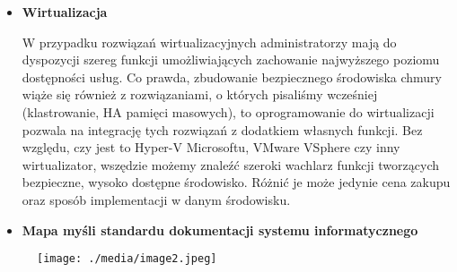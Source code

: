 \documentclass[12pt]{article}
\renewcommand{\_}{\kern-1.5pt\textunderscore\kern-1.5pt}
\begin{document}
\begin{itemize}
\vspace{\baselineskip}
	\item \textbf{Wirtualizacja}\par

W przypadku rozwiązań wirtualizacyjnych administratorzy mają do dyspozycji szereg funkcji umożliwiających zachowanie najwyższego poziomu dostępności usług. Co prawda, zbudowanie bezpiecznego środowiska chmury wiąże się również z rozwiązaniami, o których pisaliśmy wcześniej (klastrowanie, HA pamięci masowych), to oprogramowanie do wirtualizacji pozwala na integrację tych rozwiązań z dodatkiem własnych funkcji. Bez względu, czy jest to Hyper-V Microsoftu, VMware VSphere czy inny wirtualizator, wszędzie możemy znaleźć szeroki wachlarz funkcji tworzących bezpieczne, wysoko dostępne środowisko. Różnić je może jedynie cena zakupu oraz sposób implementacji w danym środowisku.\par


\vspace{\baselineskip}

\vspace{\baselineskip}

\vspace{\baselineskip}
	\item \textbf{Mapa myśli standardu dokumentacji systemu informatycznego }
\end{itemize}\par




\begin{figure}[H]
	\begin{Center}
		\texttt{[image: ./media/image2.jpeg]}
	\end{Center}
\end{figure}




\vspace{\baselineskip}

\vspace{\baselineskip}

\vspace{\baselineskip}

\vspace{\baselineskip}

\vspace{\baselineskip}

\vspace{\baselineskip}

\vspace{\baselineskip}

\vspace{\baselineskip}

\vspace{\baselineskip}

\vspace{\baselineskip}

\vspace{\baselineskip}

\printbibliography
\end{document}

